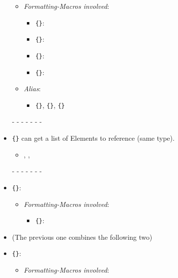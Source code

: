 \begin{itemize}
		\begin{itemize}
			\item \textit{Formatting-Macros involved}:
			\begin{itemize}
				\item \texttt{\{\}}: 
				\item \texttt{\{\}}: 
				\item \texttt{\{\}}: 
				\item \texttt{\{\}}: 
			\end{itemize}
			\item \textit{Alias}:
			\begin{itemize}
				\item \texttt{\{\}}, \texttt{\{\}}, \texttt{\{\}}
			\end{itemize}
		\end{itemize}
	\item[-]- - - - - -
	\item \texttt{\{\}} can get a list of Elements to reference (same type).
		\begin{itemize}
			\item {}, , 
		\end{itemize}
	\item[-]- - - - - -
	\item \texttt{\{\}}: 
		\begin{itemize}
			\item \textit{Formatting-Macros involved}:
			\begin{itemize}
				\item \texttt{\{\}}: 
			\end{itemize}
		\end{itemize}
	\item (The previous one combines the following two)
	\item \texttt{\{\}}: 
		\begin{itemize}
			\item \textit{Formatting-Macros involved}:

\end{itemize}
\end{itemize}
